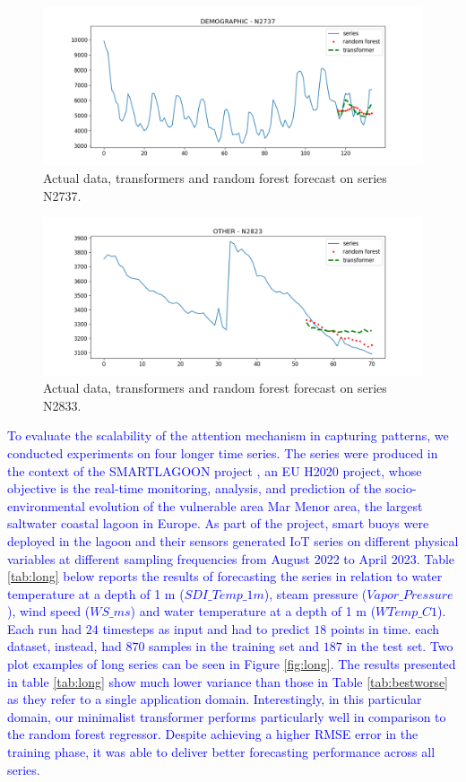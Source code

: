 \documentclass[algorithms,article,submit,pdftex,moreauthors]{Definitions/mdpi}
\begin{document}
\begin{figure}[ht]
	\centering
	\includegraphics[width=1.0\linewidth]{N2737.png}
	\caption{Actual data, transformers and random forest forecast on series N2737.}
	\label{fig:trbest}
\end{figure}
\begin{figure}
	\centering
	\includegraphics[width=1.0\linewidth]{N2823.png}
	\caption{Actual data, transformers and random forest forecast on series N2833.}
	\label{fig:trworse}
\end{figure}


\textcolor{blue}{To evaluate the scalability of the attention mechanism in capturing patterns, we conducted experiments on four longer time series. The series were produced in the context of the SMARTLAGOON project \cite{CMT21}, an EU H2020 project, whose objective is the real-time monitoring, analysis, and prediction of the socio-environmental evolution of the vulnerable area Mar Menor area, the largest saltwater coastal lagoon in Europe. As part of the project, smart buoys were deployed in the lagoon and their sensors generated IoT series on different physical variables at different sampling frequencies from August 2022 to April 2023.
Table \ref{tab:long} below reports the results of forecasting the series in relation to water temperature at a depth of 1 m ($SDI\_Temp\_1m$), steam pressure ($Vapor\_Pressure$), wind speed ($WS\_ms$) and water temperature at a depth of 1 m ($WTemp\_C1$). Each run had $24$ timesteps as input and had to predict $18$ points in time. each dataset, instead, had $870$ samples in the training set and $187$ in the test set. Two plot examples of long series can be seen in Figure \ref{fig:long}.
%
The results presented in table \ref{tab:long} show much lower variance than those in Table \ref{tab:bestworse} as they refer to a single application domain. Interestingly, in this particular domain, our minimalist transformer performs particularly well in comparison to the random forest regressor. Despite achieving a higher RMSE error in the training phase, it was able to deliver better forecasting performance across all series.}
\end{document}
